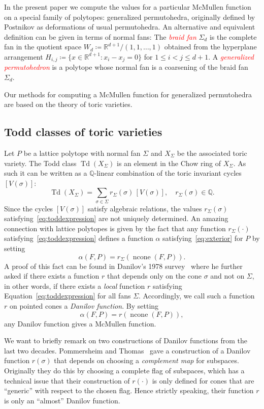 \documentclass[ALCO,ThmDefs,Unicode,epreuves]{cedram}
\newcommand\Q{{\mathbb Q}}
\newcommand\R{{\mathbb R}}
\newcommand{\important}[1]{\emph{\textcolor{red}{#1}}}
\DeclareMathOperator{\ncone}{ncone}
\DeclareMathOperator{\td}{Td}
\begin{document}
In the present paper we compute the values for a particular McMullen function on a special family of polytopes: generalized permutohedra, originally defined by Postnikov as deformations of usual permutohedra. An alternative and equivalent definition can be given in terms of normal fans: The \important{braid fan} $\Sigma_d$ is the complete fan in the quotient space $W_d \coloneqq \R^{d+1}/(1,1,\dots,1)$ obtained from the hyperplane arrangement $H_{i,j}\coloneqq \{x\in\R^{d+1}: x_i-x_j=0\}$ for $1\leq i<j\leq d+1$.
A \important{generalized permutohedron} is a polytope whose normal fan is a coarsening of the braid fan $\Sigma_d.$


Our methods for computing a McMullen function for generalized permutohedra are based on the theory of toric varieties.
\subsection{Todd classes of toric varieties}\label{subsec:toddintro}

Let $P$ be a lattice polytope with normal fan $\Sigma$ and $X_\Sigma$ be the associated toric variety. The Todd class $\td(X_\Sigma)$ is an element in the Chow ring of $X_\Sigma$. As such it can be written as a $\Q$-linear combination of the toric invariant cycles $[V(\sigma)]$:
\begin{equation}\label{eq:toddexpression}
\td(X_\Sigma) = \sum_{\sigma\in \Sigma} r_\Sigma(\sigma)\, [V(\sigma)],\quad r_\Sigma(\sigma)\in\Q.
\end{equation}
Since the cycles $[V(\sigma)]$ satisfy algebraic relations, the values $r_\Sigma(\sigma)$ satisfying~\eqref{eq:toddexpression} are not uniquely determined. 
An amazing connection with lattice polytopes is given by the fact that any function $r_\Sigma(\cdot)$ satisfying~\eqref{eq:toddexpression} defines a function $\alpha$ satisfying~\eqref{eq:exterior} for $P$ by setting 
\[\alpha(F,P)=r_{\Sigma}(\ncone(F,P)).\] A proof of this fact can be found in Danilov's 1978 survey~\cite{danilov} where he further asked if there exists a function $r$ that depends only on the cone $\sigma$ and not on $\Sigma$, in other words, if there exists a \emph{local} function $r$ satisfying Equation~\eqref{eq:toddexpression} for all fans $\Sigma$.
Accordingly, we call such a function $r$ on pointed cones a \emph{Danilov function}. By setting \[\alpha(F,P)=r(\ncone(F,P)),\] any Danilov function gives a McMullen function.



We want to briefly remark on two constructions of Danilov functions from the last two decades. Pommersheim and Thomas~\cite{toddclass} gave a construction of a Danilov function $r(\sigma)$ that depends on choosing a \emph{complement map} for subspaces. Originally they do this by choosing a complete flag of subspaces, which has a technical issue that their construction of $r(\cdot)$ is only defined for cones that are ``generic'' with respect to the chosen flag. Hence strictly speaking, their function $r$ is only an ``almost'' Danilov function.
\end{document}
